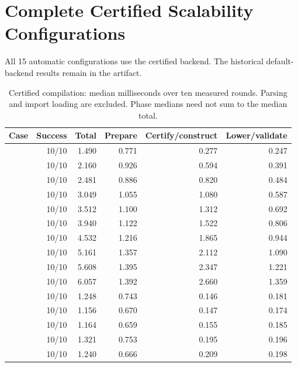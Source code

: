 \section{Complete Certified Scalability Configurations}
All 15 automatic configurations use the certified backend. The historical default-backend results remain in the artifact.

\begin{table}[!htbp]
\caption{Certified compilation: median milliseconds over ten measured rounds. Parsing and import loading are excluded. Phase medians need not sum to the median total.}
\label{supp-tab:scalability-results}
\small
\begin{tabularx}{\linewidth}{@{}Yrrrrr@{}}\toprule
Case & Success & Total & Prepare & Certify/construct & Lower/validate\\\midrule
{} & 10/10 & 1.490 & 0.771 & 0.277 & 0.247\\
 & 10/10 & 2.160 & 0.926 & 0.594 & 0.391\\
 & 10/10 & 2.481 & 0.886 & 0.820 & 0.484\\
 & 10/10 & 3.049 & 1.055 & 1.080 & 0.587\\
 & 10/10 & 3.512 & 1.100 & 1.312 & 0.692\\
 & 10/10 & 3.940 & 1.122 & 1.522 & 0.806\\
 & 10/10 & 4.532 & 1.216 & 1.865 & 0.944\\
 & 10/10 & 5.161 & 1.357 & 2.112 & 1.090\\
 & 10/10 & 5.608 & 1.395 & 2.347 & 1.221\\
 & 10/10 & 6.057 & 1.392 & 2.660 & 1.359\\
 & 10/10 & 1.248 & 0.743 & 0.146 & 0.181\\
 & 10/10 & 1.156 & 0.670 & 0.147 & 0.174\\
 & 10/10 & 1.164 & 0.659 & 0.155 & 0.185\\
 & 10/10 & 1.321 & 0.753 & 0.195 & 0.196\\
 & 10/10 & 1.240 & 0.666 & 0.209 & 0.198\\
\bottomrule\end{tabularx}
\end{table}
